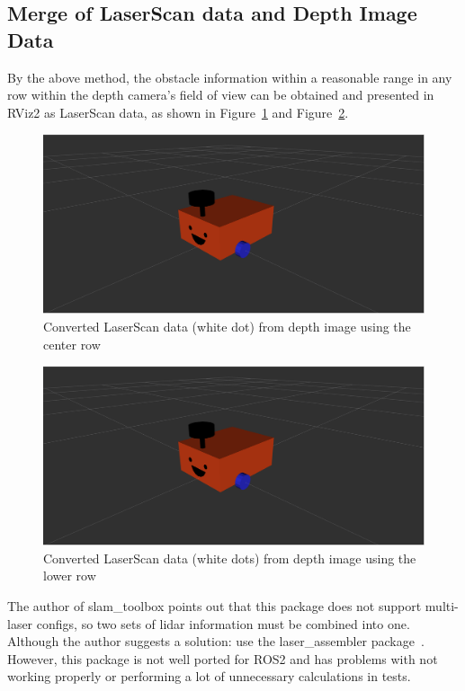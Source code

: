 \subsection{Merge of LaserScan data and Depth Image Data}
By the above method, the obstacle information 
within a reasonable range in any row within the depth camera's field of view can be obtained and presented
in RViz2 as LaserScan data, as shown in Figure~\ref{fig:centre_row} and Figure~\ref{fig:lower_row}.
\begin{figure}[H]
    \centering
    \includegraphics[width=0.8\linewidth]{figs/robot.png}
    \caption{Converted LaserScan data (white dot) from depth image using the center row}
    \label{fig:centre_row}
\end{figure}
\begin{figure}[H]
    \centering
    \includegraphics[width=0.8\linewidth]{figs/robot.png}
    \caption{Converted LaserScan data (white dots) from depth image using the lower row}
    \label{fig:lower_row}
\end{figure}
The author of slam\_toolbox points out that this package does not support multi-laser configs, 
so two sets of lidar information must be combined into one. 
Although the author suggests a solution: use the laser\_assembler package~\cite{github}.
However, this package is not well ported for ROS2
and has problems with not working properly or performing a lot of unnecessary calculations in tests. 

